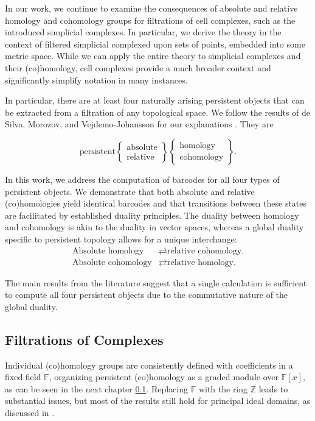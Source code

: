 In our work, we continue to examine the consequences of absolute and relative
homology and cohomology groups for filtrations of cell complexes, such as the introduced
simplicial complexes. In particular, we derive the theory in the context of filtered
simplicial complexed upon sets of points, embedded into some metric space. While
we can apply the entire theory to simplicial complexes and their (co)homology, cell
complexes provide a much broader context and significantly simplify notation in many
instances.

In particular, there are at least four naturally arising persistent objects that
can be extracted from a filtration of any topological space. We follow the results
of de Silva, Morozov, and Vejdemo-Johansson for our explanations \cite[§1]{de2011dualities}.
They are

\begin{equation*}
	\text{persistent}
	\begin{Bmatrix}
		\text{absolute} \\
		\text{relative}
	\end{Bmatrix}
	\begin{Bmatrix}
		\text{homology}   \\
		\text{cohomology}
	\end{Bmatrix}.
\end{equation*}

In this work, we address the computation of barcodes for all four types of persistent
objects. We demonstrate that both absolute and relative (co)homologies yield identical
barcodes and that transitions between these states are facilitated by established
duality principles. The duality between homology and cohomology is akin to the
duality in vector spaces, whereas a global duality specific to persistent topology
allows for a unique interchange:
\begin{align*}
	\text{Absolute homology}   & \rightleftarrows \text{relative cohomology.} \\
	\text{Absolute cohomology} & \rightleftarrows \text{relative homology.}
\end{align*}

The main results from the literature suggest that a single calculation is sufficient
to compute all four persistent objects due to the commutative nature of the global
duality.

\subsection{Filtrations of Complexes}
Individual (co)homology groups are consistently defined with coefficients in a
fixed field $\mathbb{F}$, organizing persistent (co)homology as a graded module
over $\mathbb{F}[x]$, as can be seen in the next chapter \ref{}. Replacing
$\mathbb{F}$ with the ring $\mathbb{Z}$ leads to substantial issues, but most of
the results still hold for principal ideal domains, as discussed in
\cite[§3.1]{zomorodian2004computing}.


